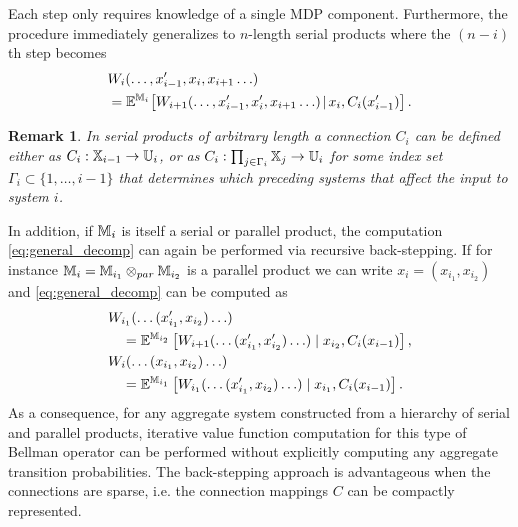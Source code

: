 \documentclass[conference]{IEEEtran}
\newtheorem{remark}{Remark}
\begin{document}
Each step only requires knowledge of a single MDP component. Furthermore, the procedure immediately generalizes to $n$-length serial products where the $(n-i)$th step becomes
\begin{equation}
\label{eq:general_decomp}
\begin{aligned}
	& W_i (\ldots, x_{i-1}', x_i, x_{i+1} \ldots) \\
	& = \mathbb{E}^{\MDP_i}\hspace{-0.5mm}  \left[ W_{i+1} (\ldots, x_{i-1}', x_i', x_{i+1} \ldots) \hspace{-0.5mm} \mid\hspace{-0.5mm}  x_i, C_i(x_{i-1}') \right].
\end{aligned}
\end{equation}
\begin{remark}
  In serial products of arbitrary length a connection $C_i$ can be defined either as $C_i: \mathbb{X}_{i-1} \rightarrow \mathbb{U}_i$, or as $C_i: \prod_{j \in \Gamma_i} \mathbb{X}_j \rightarrow \mathbb{U}_i$ for some index set $\Gamma_i \subset \{ 1, \ldots, i-1 \}$ that determines which preceding systems that affect the input to system $i$.
\end{remark}
In addition, if $\mathbb{M}_{i}$ is itself a serial or parallel product, the computation \eqref{eq:general_decomp} can again be performed via recursive back-stepping. If for instance $\mathbb{M}_{i} = \mathbb{M}_{i_1} \otimes_{par} \mathbb{M}_{i_2}$ is a parallel product we can write $x_i = (x_{i_1}, x_{i_2})$ and \eqref{eq:general_decomp} can be computed as
\begin{equation}
\begin{aligned}
	& W_{i_1}(\ldots (x_{i_1}', x_{i_2}) \ldots) \\
	& \quad = \mathbb{E}^{\mathbb{M}_{i_2}} \left[ W_{i+1}(\ldots (x_{i_1}', x_{i_2}') \ldots) \mid x_{i_2}, C_i(x_{i-1}) \right], \\
	& W_{i}(\ldots (x_{i_1}, x_{i_2}) \ldots) \\
	& \quad = \mathbb{E}^{\mathbb{M}_{i_1}} \left[ W_{i_1}(\ldots (x_{i_1}', x_{i_2}) \ldots) \mid x_{i_1}, C_i(x_{i-1}) \right].
\end{aligned}
\end{equation}
As a consequence, for any aggregate system constructed from a hierarchy of serial and parallel products, iterative value function computation for this type of Bellman operator can be performed without explicitly computing any aggregate transition probabilities. The back-stepping approach is advantageous when the connections are sparse, i.e. the connection mappings $C$ can be compactly represented.
\end{document}
